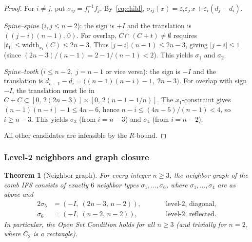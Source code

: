 \documentclass{amsart}
\newtheorem{theorem}{Theorem}[section]
\theoremstyle{definition}
\theoremstyle{remark}
\begin{document}
\begin{proof}
For $i\ne j$, put $\sigma_{ij} = f_i^{-1} f_j$.  By~\eqref{eq:child},
$\sigma_{ij}(x) = \varepsilon_i\varepsilon_j\, x
  + \varepsilon_i(d_j - d_i)$.

\emph{Spine--spine} ($i, j \le n{-}2$): the sign is $+I$ and the
translation is $((j{-}i)(n{-}1),\, 0)$.
For overlap, $C \cap (C + t) \ne \emptyset$ requires
$|t_1| \le \mathrm{width}_{x_1}(C) \le 2n{-}3$.  Thus
$|j{-}i|\,(n{-}1) \le 2n{-}3$, giving $|j{-}i| \le 1$ (since
$(2n{-}3)/(n{-}1) = 2 - 1/(n{-}1) < 2$).  This yields
$\sigma_1$ and $\sigma_2$.

\emph{Spine--tooth} ($i \le n{-}2,\; j = n{-}1$ or vice versa):
the sign is $-I$ and the translation is
$d_{n-1} - d_i = \bigl((n{-}1)(n{-}i) - 1,\; 2n{-}3\bigr)$.
For overlap with sign $-I$, the translation must lie in
$C + C \subset [0,\, 2(2n{-}3)] \times [0,\, 2(n{-}1{-}1/n)]$.
The $x_1$-constraint gives $(n{-}1)(n{-}i) - 1 \le 4n{-}6$,
hence $n{-}i \le (4n{-}5)/(n{-}1) < 4$, so $i \ge n{-}3$.
This yields $\sigma_3$ (from $i = n{-}3$) and $\sigma_4$ (from
$i = n{-}2$).

All other candidates are infeasible by the $R$-bound.
\end{proof}

\subsubsection{Level-2 neighbors and graph closure}

\begin{theorem}[Neighbor graph]\label{thm:graph}
For every integer $n \ge 3$, the neighbor graph of the comb IFS consists
of exactly $6$ neighbor types $\sigma_1, \ldots, \sigma_6$, where
$\sigma_1, \ldots, \sigma_4$ are as above and
\begin{alignat*}{2}
  \sigma_5 &= (-I,\; (2n{-}3,\, n{-}2)),
    &\qquad& \text{level-2, diagonal}, \\
  \sigma_6 &= (-I,\; (n{-}2,\, n{-}2)),
    &\qquad& \text{level-2, reflected}.
\end{alignat*}
In particular, the Open Set Condition holds for all $n \ge 3$
(and trivially for $n = 2$, where $C_2$ is a rectangle).
\end{theorem}
\end{document}
